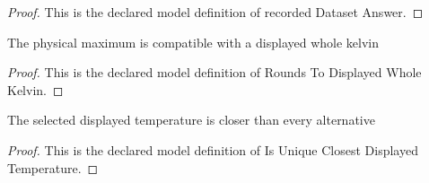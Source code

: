 \begin{proof}
  This is the declared model definition of recorded Dataset Answer.
\end{proof}
\begin{definition}
  \label{def:physics:phyx-mini-0370:phyxminiproblems-problemphyxmini0370-roundstodisplayedwholekelvin}
  The physical maximum is compatible with a displayed whole kelvin
\end{definition}
\begin{proof}
  This is the declared model definition of Rounds To Displayed Whole Kelvin.
\end{proof}
\begin{definition}
  \label{def:physics:phyx-mini-0370:phyxminiproblems-problemphyxmini0370-isuniqueclosestdisplayedtemperature}
  The selected displayed temperature is closer than every alternative
\end{definition}
\begin{proof}
  This is the declared model definition of Is Unique Closest Displayed Temperature.
\end{proof}
